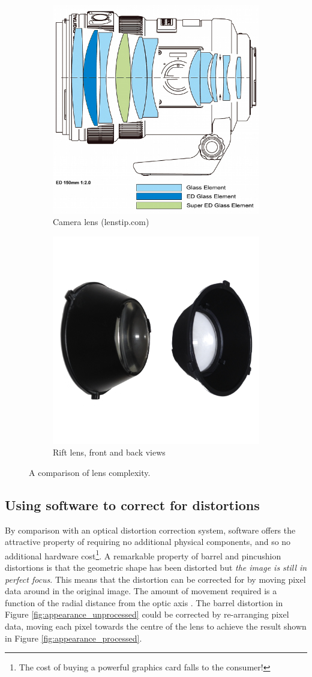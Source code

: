 \documentclass[MSc,paper=a4,pagesize=auto]{icldt}
\begin{document}
\begin{figure}[htbp!]
\centering
\begin{subfigure}{0.5\textwidth}
    \centering
    \includegraphics[width=0.5\linewidth]{resources/camera_lens}
    \caption{Camera lens (lenstip.com)}
	\label{fig:camera_lens}
\end{subfigure}%
\centering
\begin{subfigure}{0.5\textwidth}
    \centering
    \includegraphics[width=0.5\linewidth]{resources/rift_lenses}
    \caption{Rift lens, front and back views}
	\label{fig:rift_lens}
\end{subfigure}    
    \caption{A comparison of lens complexity.}
    \label{fig:lens_comparison}
\end{figure}

\clearpage
\subsection{Using software to correct for distortions}
By comparison with an optical distortion correction system, software offers the attractive property of requiring no additional physical components, and so no additional hardware cost\footnote{The cost of buying a powerful graphics card falls to the consumer!}. A remarkable property of barrel and pincushion distortions is that the geometric shape has been distorted but \textit{the image is still in perfect focus}. This means that the distortion can be corrected for by moving pixel data around in the original image. The amount of movement required is a function of the radial distance from the optic axis \cite{Brunelli2009}. The barrel distortion in Figure \ref{fig:appearance_unprocessed} could be corrected by re-arranging pixel data, moving each pixel towards the centre of the lens to achieve the result shown in Figure \ref{fig:appearance_processed}.
\end{document}
